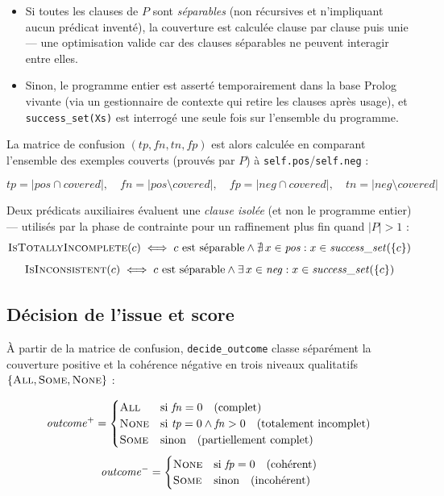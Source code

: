 \begin{itemize}
  \item Si toutes les clauses de $P$ sont \emph{séparables} (non
    récursives et n'impliquant aucun prédicat inventé), la couverture
    est calculée clause par clause puis unie --- une optimisation
    valide car des clauses séparables ne peuvent interagir entre elles.
  \item Sinon, le programme entier est asserté temporairement dans la
    base Prolog vivante (via un gestionnaire de contexte qui retire les
    clauses après usage), et \texttt{success\_set(Xs)} est interrogé
    une seule fois sur l'ensemble du programme.
\end{itemize}

La matrice de confusion $(\mathit{tp}, \mathit{fn}, \mathit{tn},
\mathit{fp})$ est alors calculée en comparant l'ensemble des exemples
couverts (prouvés par $P$) à \texttt{self.pos}/\texttt{self.neg} :

\[
  \mathit{tp} = |\mathit{pos} \cap \mathit{covered}|, \quad
  \mathit{fn} = |\mathit{pos} \setminus \mathit{covered}|, \quad
  \mathit{fp} = |\mathit{neg} \cap \mathit{covered}|, \quad
  \mathit{tn} = |\mathit{neg} \setminus \mathit{covered}|
\]

Deux prédicats auxiliaires évaluent une \emph{clause isolée} (et non le
programme entier) --- utilisés par la phase de contrainte pour un
raffinement plus fin quand $|P| > 1$ :
\[
  \textsc{IsTotallyIncomplete}(c) \iff \text{$c$ est séparable} \land
    \nexists\, x \in \mathit{pos} : x \in \mathit{success\_set}(\{c\})
\]
\[
  \textsc{IsInconsistent}(c) \iff \text{$c$ est séparable} \land
    \exists\, x \in \mathit{neg} : x \in \mathit{success\_set}(\{c\})
\]

\subsection{Décision de l'issue et score}
\label{sec:popper-outcome}

À partir de la matrice de confusion, \texttt{decide\_outcome} classe
séparément la couverture positive et la cohérence négative en trois
niveaux qualitatifs $\{\textsc{All}, \textsc{Some}, \textsc{None}\}$ :

\[
  \mathit{outcome}^+ =
  \begin{cases}
    \textsc{All}  & \text{si } \mathit{fn} = 0 \quad\text{(complet)} \\
    \textsc{None} & \text{si } \mathit{tp} = 0 \land \mathit{fn} > 0 \quad\text{(totalement incomplet)} \\
    \textsc{Some} & \text{sinon} \quad\text{(partiellement complet)}
  \end{cases}
\]
\[
  \mathit{outcome}^- =
  \begin{cases}
    \textsc{None} & \text{si } \mathit{fp} = 0 \quad\text{(cohérent)} \\
    \textsc{Some} & \text{sinon} \quad\text{(incohérent)}
  \end{cases}
\]

